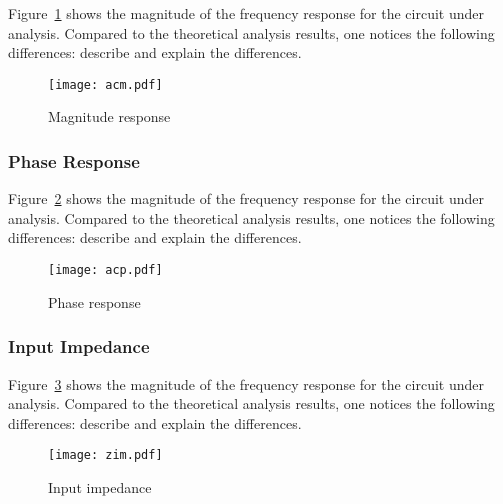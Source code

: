 Figure~\ref{fig:acm} shows the magnitude of the frequency response for the
circuit under analysis. Compared to the theoretical analysis results, one
notices the following differences: describe and explain the differences.

\begin{figure}[h] \centering
\texttt{[image: acm.pdf]}
\caption{Magnitude response}
\label{fig:acm}
\end{figure}

\lipsum[1-1]

\subsubsection{Phase Response}

Figure~\ref{fig:acp} shows the magnitude of the frequency response for the
circuit under analysis. Compared to the theoretical analysis results, one
notices the following differences: describe and explain the differences.

\begin{figure}[h] \centering
\texttt{[image: acp.pdf]}
\caption{Phase response}
\label{fig:acp}
\end{figure}

\lipsum[1-1]

\subsubsection{Input Impedance}

Figure~\ref{fig:zim} shows the magnitude of the frequency response for the
circuit under analysis. Compared to the theoretical analysis results, one
notices the following differences: describe and explain the differences.

\begin{figure}[h] \centering
\texttt{[image: zim.pdf]}
\caption{Input impedance}
\label{fig:zim}
\end{figure}

\lipsum[1-1]



